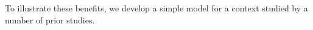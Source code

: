 To illustrate these benefits, we develop a simple model for a context studied by a number of prior studies.

% 
%
%
